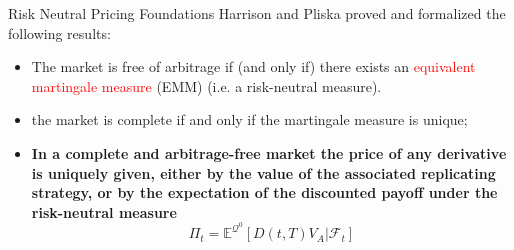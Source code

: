 \documentclass{beamer}
\begin{document}
\begin{frame}{Risk Neutral Pricing Foundations}
	Harrison and Pliska proved and formalized the following results:
	\begin{itemize}
		\item The market is free of arbitrage if (and only if) there exists an \textcolor{red}{equivalent martingale measure} (EMM) (i.e. a risk-neutral measure).
		\item the market is complete if and only if the martingale measure is unique;
		\item \textbf{In a complete and arbitrage-free market the price of any derivative is uniquely given, either by the value of the associated replicating strategy, or by the expectation of the discounted payoff under the risk-neutral measure}
		\begin{equation}
			\Pi_t = \mathbb{E}^{\mathcal{Q}^0}[D(t,T)V_A|\mathcal{F}_t]
			\label{eq:risk_neutral_pricing}
		\end{equation}
	\end{itemize}
\end{frame}
%
\end{document}

